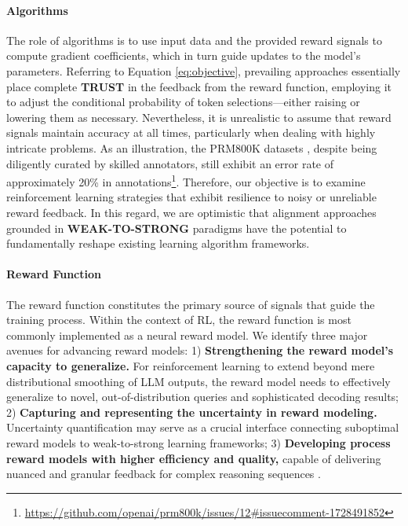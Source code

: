 {\paragraph{Algorithms} The role of algorithms is to use input data and the provided reward signals to compute gradient coefficients, which in turn guide updates to the model’s parameters. Referring to Equation \ref{eq:objective}, prevailing approaches essentially place complete \textbf{TRUST} in the feedback from the reward function, employing it to adjust the conditional probability of token selections—either raising or lowering them as necessary. Nevertheless, it is unrealistic to assume that reward signals maintain accuracy at all times, particularly when dealing with highly intricate problems. As an illustration, the PRM800K datasets \citep{lightman2023let}, despite being diligently curated by skilled annotators, still exhibit an error rate of approximately 20\% in annotations\footnote{\url{https://github.com/openai/prm800k/issues/12\#issuecomment-1728491852}}. Therefore, our objective is to examine reinforcement learning strategies that exhibit resilience to noisy or unreliable reward feedback. In this regard, we are optimistic that alignment approaches grounded in \textbf{WEAK-TO-STRONG} paradigms \citep{burns2023weak} have the potential to fundamentally reshape existing learning algorithm frameworks.

\paragraph{Reward Function} The reward function constitutes the primary source of signals that guide the training process. Within the context of RL, the reward function is most commonly implemented as a neural reward model. We identify three major avenues for advancing reward models: 1) \textbf{Strengthening the reward model’s capacity to generalize.} For reinforcement learning to extend beyond mere distributional smoothing of LLM outputs, the reward model needs to effectively generalize to novel, out-of-distribution queries and sophisticated decoding results; 2) \textbf{Capturing and representing the uncertainty in reward modeling.} Uncertainty quantification may serve as a crucial interface connecting suboptimal reward models to weak-to-strong learning frameworks; 3) \textbf{Developing process reward models with higher efficiency and quality,} capable of delivering nuanced and granular feedback for complex reasoning sequences \citep{lightman2023let,wang2023math}.

}
